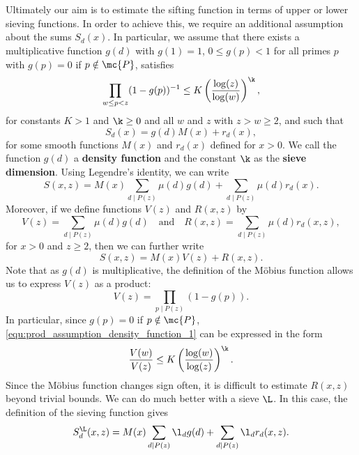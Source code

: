   \section{}
    Ultimately our aim is to estimate the sifting function in terms of upper or lower sieving functions. In order to achieve this, we require an additional assumption about the sums $S_{d}(x)$. In particular, we assume that there exists a multiplicative function $g(d)$ with $g(1) = 1$, $0 \le g(p) < 1$ for all primes $p$ with $g(p) = 0$ if $p \notin \mc{P}$, satisfies
    \begin{equation}\label{equ:prod_assumption_density_function_1}
      \prod_{w \le p < z}(1-g(p))^{-1} \le K\left(\frac{\log(z)}{\log(w)}\right)^{\k},
    \end{equation}
    for constants $K > 1$ and $\k \ge 0$ and all $w$ and $z$ with $z > w \ge 2$, and such that  
    \begin{equation}\label{equ:d_multiple_sifting_function}
      S_{d}(x) = g(d)M(x)+r_{d}(x),
    \end{equation}
    for some smooth functions $M(x)$ and $r_{d}(x)$ defined for $x > 0$. We call the function $g(d)$ a \textbf{density function} and the constant $\k$ as the \textbf{sieve dimension}. Using Legendre's identity, we can write
    \[
      S(x,z) = M(x)\sum_{d \mid P(z)}\mu(d)g(d)+\sum_{d \mid P(z)}\mu(d)r_{d}(x).
    \]
    Moreover, if we define functions $V(z)$ and $R(x,z)$ by
    \[
      V(z) = \sum_{d \mid P(z)}\mu(d)g(d) \quad \text{and} \quad R(x,z) = \sum_{d \mid P(z)}\mu(d)r_{d}(x,z),
    \]
    for $x > 0$ and $z \ge 2$, then we can further write
    \[
      S(x,z) = M(x)V(z)+R(x,z).
    \]
    Note that as $g(d)$ is multiplicative, the definition of the M\"obius function allows us to express $V(z)$ as a product:
    \[
      V(z) = \prod_{p \mid P(z)}(1-g(p)).
    \]
    In particular, since $g(p) = 0$ if $p \notin \mc{P}$, \cref{equ:prod_assumption_density_function_1} can be expressed in the form
    \begin{equation}\label{equ:prod_assumption_density_function_2}
      \frac{V(w)}{V(z)} \le K\left(\frac{\log(w)}{\log(z)}\right)^{\k}.
    \end{equation}
    Since the M\"obius function changes sign often, it is difficult to estimate $R(x,z)$ beyond trivial bounds. We can do much better with a sieve $\L$. In this case, the definition of the sieving function gives
    \[
      S_{d}^{\L}(x,z) = M(x)\sum_{d \mid P(z)}\l_{d}g(d)+\sum_{d \mid P(z)}\l_{d}r_{d}(x,z).
    \]
